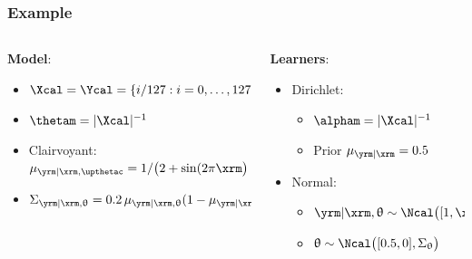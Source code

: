 \documentclass[aspectratio=169]{beamer}
\begin{document}
\begin{frame}
\frametitle{Example}

\begin{columns}[T]

\begin{column}{.5\linewidth}

\textbf{Model}:
\begin{itemize}
\item $\Xcal = \Ycal = \{i/127: i = 0, \ldots, 127\}$
\item $\thetam = |\Xcal|^{-1}$
\item \alert{Clairvoyant}: $\mu_{\yrm | \xrm,\upthetac} = 1 / \big(2 + \sin(2\pi \xrm\big)$
\item $\Sigma_{\yrm | \xrm, \uptheta} = 0.2 \, \mu_{\yrm | \xrm, \uptheta} (1 - \mu_{\yrm | \xrm, \uptheta})$
\end{itemize}


\end{column}

\begin{column}{.5\linewidth}

\textbf{Learners}:
\begin{itemize}
\item Dirichlet:
\begin{itemize}
\item $\alpham = |\Xcal|^{-1}$ 
\item \alert{Prior} $\mu_{\yrm | \xrm} = 0.5$
\end{itemize}

\item Normal\footnotemark:
\begin{itemize}
\item $\yrm | \xrm, \uptheta \sim \Ncal\big([1, \xrm] \uptheta, 0.1 \big)$ 
\item $\uptheta \sim \Ncal\big([0.5, 0], \Sigma_{\uptheta}\big)$
\end{itemize}
\end{itemize}



\end{column}
\end{columns}
\end{frame}
\end{document}
